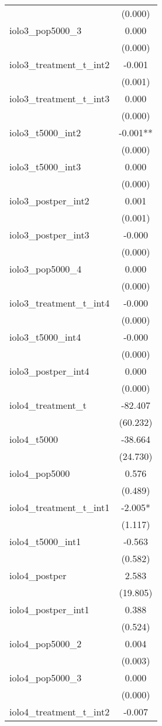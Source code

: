 \documentclass[]{article}
\begin{document}
\begin{tabular}{lc}
 & (0.000) \\
iolo3\_pop5000\_3 & 0.000 \\
 & (0.000) \\
iolo3\_treatment\_t\_int2 & -0.001 \\
 & (0.001) \\
iolo3\_treatment\_t\_int3 & 0.000 \\
 & (0.000) \\
iolo3\_t5000\_int2 & -0.001** \\
 & (0.000) \\
iolo3\_t5000\_int3 & 0.000 \\
 & (0.000) \\
iolo3\_postper\_int2 & 0.001 \\
 & (0.001) \\
iolo3\_postper\_int3 & -0.000 \\
 & (0.000) \\
iolo3\_pop5000\_4 & 0.000 \\
 & (0.000) \\
iolo3\_treatment\_t\_int4 & -0.000 \\
 & (0.000) \\
iolo3\_t5000\_int4 & -0.000 \\
 & (0.000) \\
iolo3\_postper\_int4 & 0.000 \\
 & (0.000) \\
iolo4\_treatment\_t & -82.407 \\
 & (60.232) \\
iolo4\_t5000 & -38.664 \\
 & (24.730) \\
iolo4\_pop5000 & 0.576 \\
 & (0.489) \\
iolo4\_treatment\_t\_int1 & -2.005* \\
 & (1.117) \\
iolo4\_t5000\_int1 & -0.563 \\
 & (0.582) \\
iolo4\_postper & 2.583 \\
 & (19.805) \\
iolo4\_postper\_int1 & 0.388 \\
 & (0.524) \\
iolo4\_pop5000\_2 & 0.004 \\
 & (0.003) \\
iolo4\_pop5000\_3 & 0.000 \\
 & (0.000) \\
iolo4\_treatment\_t\_int2 & -0.007 \\

\end{tabular}
\end{document}
